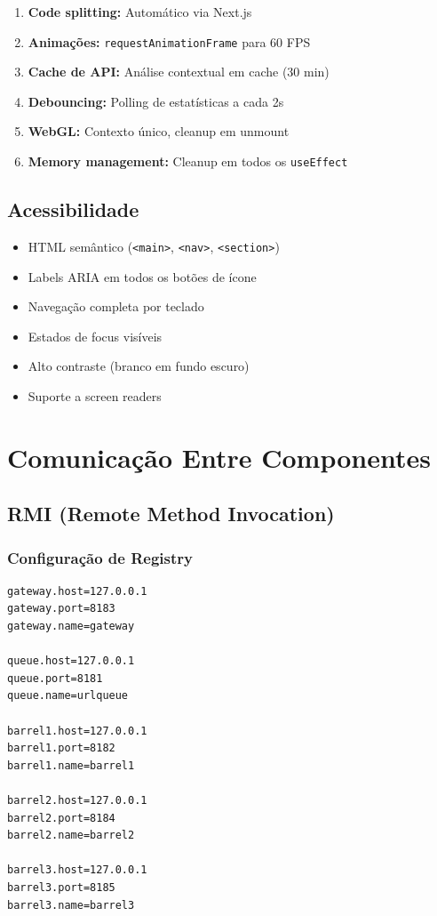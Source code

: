 \documentclass[12pt,a4paper]{article}
\begin{document}
\begin{enumerate}
    \item \textbf{Code splitting:} Automático via Next.js
    \item \textbf{Animações:} \texttt{requestAnimationFrame} para 60 FPS
    \item \textbf{Cache de API:} Análise contextual em cache (30 min)
    \item \textbf{Debouncing:} Polling de estatísticas a cada 2s
    \item \textbf{WebGL:} Contexto único, cleanup em unmount
    \item \textbf{Memory management:} Cleanup em todos os \texttt{useEffect}
\end{enumerate}

\subsection{Acessibilidade}

\begin{itemize}
    \item HTML semântico (\texttt{<main>}, \texttt{<nav>}, \texttt{<section>})
    \item Labels ARIA em todos os botões de ícone
    \item Navegação completa por teclado
    \item Estados de focus visíveis
    \item Alto contraste (branco em fundo escuro)
    \item Suporte a screen readers
\end{itemize}

\newpage

\section{Comunicação Entre Componentes}

\subsection{RMI (Remote Method Invocation)}

\subsubsection{Configuração de Registry}
\begin{lstlisting}[caption={Configuração RMI (Config.properties)}]
gateway.host=127.0.0.1
gateway.port=8183
gateway.name=gateway

queue.host=127.0.0.1
queue.port=8181
queue.name=urlqueue

barrel1.host=127.0.0.1
barrel1.port=8182
barrel1.name=barrel1

barrel2.host=127.0.0.1
barrel2.port=8184
barrel2.name=barrel2

barrel3.host=127.0.0.1
barrel3.port=8185
barrel3.name=barrel3
\end{lstlisting}
\end{document}
